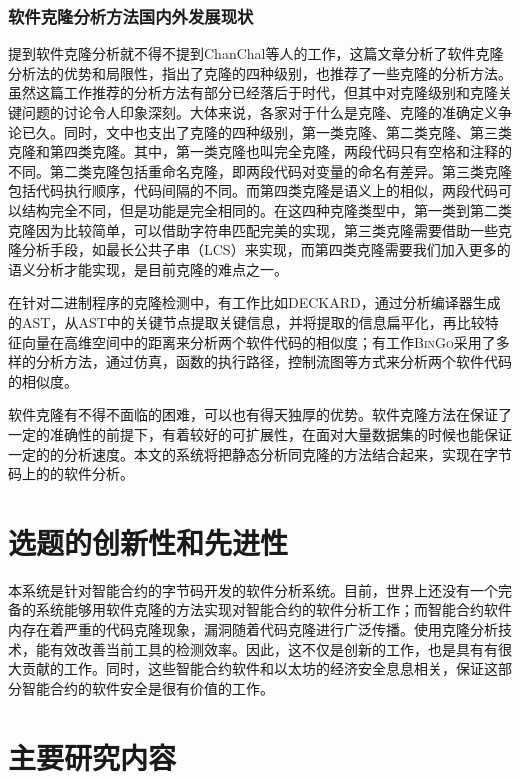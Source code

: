 \subsubsection{软件克隆分析方法国内外发展现状}\label{sec:clone_intro}
提到软件克隆分析就不得不提到ChanChal等人的工作\cite{survey-on-clone}，这篇文章分析了软件克隆分析法的优势和局限性，指出了克隆的四种级别，也推荐了一些克隆的分析方法。虽然这篇工作推荐的分析方法有部分已经落后于时代，但其中对克隆级别和克隆关键问题的讨论令人印象深刻。大体来说，各家对于什么是克隆、克隆的准确定义争论已久。同时，文中也支出了克隆的四种级别，第一类克隆、第二类克隆、第三类克隆和第四类克隆。其中，第一类克隆也叫完全克隆，两段代码只有空格和注释的不同。第二类克隆包括重命名克隆，即两段代码对变量的命名有差异。第三类克隆包括代码执行顺序，代码间隔的不同。而第四类克隆是语义上的相似，两段代码可以结构完全不同，但是功能是完全相同的。在这四种克隆类型中，第一类到第二类克隆因为比较简单，可以借助字符串匹配完美的实现，第三类克隆需要借助一些克隆分析手段，如最长公共子串（LCS）来实现，而第四类克隆需要我们加入更多的语义分析才能实现，是目前克隆的难点之一。

在针对二进制程序的克隆检测中，有工作比如\textsc{DECKARD}\cite{deckard}，通过分析编译器生成的AST，从AST中的关键节点提取关键信息，并将提取的信息扁平化，再比较特征向量在高维空间中的距离来分析两个软件代码的相似度；有工作\textsc{BinGo}\cite{bingo}采用了多样的分析方法，通过仿真，函数的执行路径，控制流图等方式来分析两个软件代码的相似度。

软件克隆有不得不面临的困难，可以也有得天独厚的优势。软件克隆方法在保证了一定的准确性的前提下，有着较好的可扩展性，在面对大量数据集的时候也能保证一定的的分析速度。本文的系统将把静态分析同克隆的方法结合起来，实现在字节码上的的软件分析。

\section{选题的创新性和先进性}

本系统是针对智能合约的字节码开发的软件分析系统。目前，世界上还没有一个完备的系统能够用软件克隆的方法实现对智能合约的软件分析工作；而智能合约软件内存在着严重的代码克隆现象，漏洞随着代码克隆进行广泛传播。使用克隆分析技术，能有效改善当前工具的检测效率。因此，这不仅是创新的工作，也是具有有很大贡献的工作。同时，这些智能合约软件和以太坊的经济安全息息相关，保证这部分智能合约的软件安全是很有价值的工作。

\section{主要研究内容}

